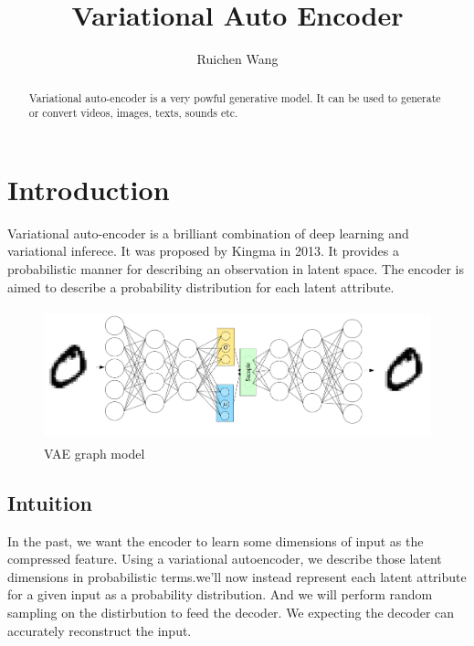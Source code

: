 \documentclass{article}
\author{Ruichen Wang}
\title{Variational Auto Encoder}
\begin{document}
\maketitle
\begin{abstract}
Variational auto-encoder \cite{DBLP:journals/corr/KingmaW13} is a very powful generative model. It can be used to generate or convert videos, images, texts, sounds etc. 
\end{abstract}

\tableofcontents
\section{Introduction} 
Variational auto-encoder is a brilliant combination of deep learning and variational inferece. It was proposed by Kingma in 2013. It provides a probabilistic manner for describing an observation in latent space. The encoder is aimed to describe a probability distribution for each latent attribute.
\begin{figure}[h]
\centering
\includegraphics[width=5in,height=1.5in]{graph1}
\caption{VAE graph model}
\end{figure}
\subsection{Intuition}
In the past, we want the encoder to learn some  dimensions of input as the compressed feature. Using a variational autoencoder, we describe those latent dimensions in probabilistic terms.we'll now instead represent each latent attribute for a given input as a probability distribution. And we will perform random sampling on the distirbution to feed the decoder. We expecting the decoder can accurately reconstruct the input.
\end{document}
